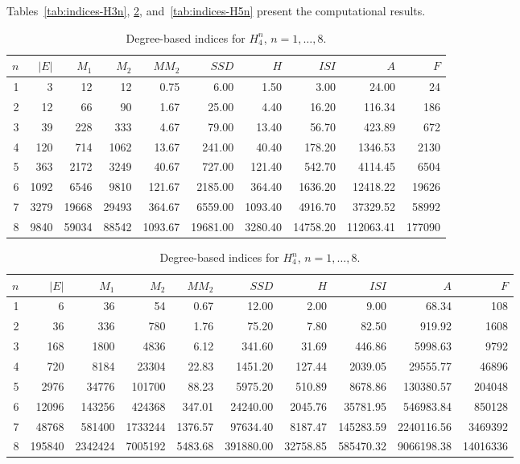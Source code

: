 \documentclass[letterpaper,12pt]{article}
\begin{document}
Tables~\ref{tab:indices-H3n}, \ref{tab:indices-H4n}, and~\ref{tab:indices-H5n} present the computational results.

 


\begin{table}
\centering
\small

\begin{tabular}{r|r r r r r r r r r}
\toprule
$n$ & $|E|$ & $M_1$ & $M_2$ & $MM_2$ & $SSD$ & $H$ & $ISI$ & $A$ & $F$ \\
\midrule
1 & 3 & 12 & 12 & 0.75 & 6.00 & 1.50 & 3.00 & 24.00 & 24 \\
2 & 12 & 66 & 90 & 1.67 & 25.00 & 4.40 & 16.20 & 116.34 & 186 \\
3 & 39 & 228 & 333 & 4.67 & 79.00 & 13.40 & 56.70 & 423.89 & 672 \\
4 & 120 & 714 & 1062 & 13.67 & 241.00 & 40.40 & 178.20 & 1346.53 & 2130 \\
5 & 363 & 2172 & 3249 & 40.67 & 727.00 & 121.40 & 542.70 & 4114.45 & 6504 \\
6 & 1092 & 6546 & 9810 & 121.67 & 2185.00 & 364.40 & 1636.20 & 12418.22 & 19626 \\
7 & 3279 & 19668 & 29493 & 364.67 & 6559.00 & 1093.40 & 4916.70 & 37329.52 & 58992 \\
8 & 9840 & 59034 & 88542 & 1093.67 & 19681.00 & 3280.40 & 14758.20 & 112063.41 & 177090 \\
\bottomrule
\end{tabular}
\caption{Degree-based indices for $H_{3}^{n}$, $n = 1, \dots, 8$.}
\label{tab:indices-H3n}
\vspace{.5cm}

\begin{tabular}{r|r r r r r r r r r}
\toprule
$n$ & $|E|$ & $M_1$ & $M_2$ & $MM_2$ & $SSD$ & $H$ & $ISI$ & $A$ & $F$ \\
\midrule
1 & 6 & 36 & 54 & 0.67 & 12.00 & 2.00 & 9.00 & 68.34 & 108 \\
2 & 36 & 336 & 780 & 1.76 & 75.20 & 7.80 & 82.50 & 919.92 & 1608 \\
3 & 168 & 1800 & 4836 & 6.12 & 341.60 & 31.69 & 446.86 & 5998.63 & 9792 \\
4 & 720 & 8184 & 23304 & 22.83 & 1451.20 & 127.44 & 2039.05 & 29555.77 & 46896 \\
5 & 2976 & 34776 & 101700 & 88.23 & 5975.20 & 510.89 & 8678.86 & 130380.57 & 204048 \\
6 & 12096 & 143256 & 424368 & 347.01 & 24240.00 & 2045.76 & 35781.95 & 546983.84 & 850128 \\
7 & 48768 & 581400 & 1733244 & 1376.57 & 97634.40 & 8187.47 & 145283.59 & 2240116.56 & 3469392 \\
8 & 195840 & 2342424 & 7005192 & 5483.68 & 391880.00 & 32758.85 & 585470.32 & 9066198.38 & 14016336 \\
\bottomrule
\end{tabular}
\caption{Degree-based indices for $H_{4}^{n}$, $n = 1, \dots, 8$.}
\label{tab:indices-H4n}


\end{table}
\end{document}
